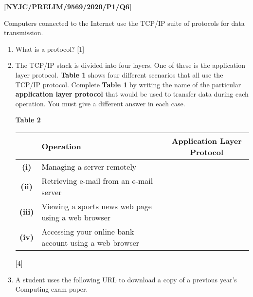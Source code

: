\item \textbf{{[}NYJC/PRELIM/9569/2020/P1/Q6{]} }

Computers connected to the Internet use the TCP/IP suite of protocols
for data transmission.
\begin{enumerate}
\item What is a protocol? {[}1{]}
\item The TCP/IP stack is divided into four layers. One of these is the
application layer protocol. \textbf{Table 1} shows four different
scenarios that all use the TCP/IP protocol. Complete \textbf{Table
1} by writing the name of the particular \textbf{application layer
protocol} that would be used to transfer data during each operation.
You must give a different answer in each case.
\noindent \begin{center}
\textbf{Table 2}
\par\end{center}

\noindent \begin{center}
\begin{tabular}{|c|l|c|}
\hline 
 & \textbf{Operation} & \textbf{Application Layer Protocol }\tabularnewline
\hline 
\hline 
\textbf{(i)} & Managing a server remotely  & \tabularnewline
\hline 
\textbf{(ii)} & Retrieving e-mail from an e-mail server & \tabularnewline
\hline 
\textbf{(iii)} & Viewing a sports news web page using a web browser  & \tabularnewline
\hline 
\textbf{(iv)} & Accessing your online bank account using a web browser & \tabularnewline
\hline 
\end{tabular}
\par\end{center}

{[}4{]}
\item A student uses the following URL to download a copy of a previous
year\textquoteright s Computing exam paper.


\end{enumerate}
